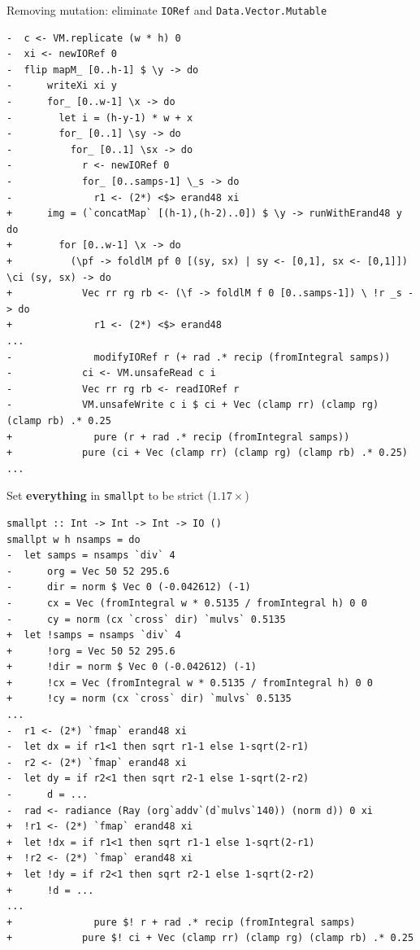 \documentclass[8pt]{beamer}
\begin{document}
\begin{frame}[fragile]{Removing mutation: eliminate \texttt{IORef} and \texttt{Data.Vector.Mutable}}
\begin{verbatim}
-  c <- VM.replicate (w * h) 0
-  xi <- newIORef 0
-  flip mapM_ [0..h-1] $ \y -> do
-      writeXi xi y
-      for_ [0..w-1] \x -> do
-        let i = (h-y-1) * w + x
-        for_ [0..1] \sy -> do
-          for_ [0..1] \sx -> do
-            r <- newIORef 0
-            for_ [0..samps-1] \_s -> do
-              r1 <- (2*) <$> erand48 xi
+      img = (`concatMap` [(h-1),(h-2)..0]) $ \y -> runWithErand48 y do
+        for [0..w-1] \x -> do
+          (\pf -> foldlM pf 0 [(sy, sx) | sy <- [0,1], sx <- [0,1]]) \ci (sy, sx) -> do
+            Vec rr rg rb <- (\f -> foldlM f 0 [0..samps-1]) \ !r _s -> do
+              r1 <- (2*) <$> erand48
...
-              modifyIORef r (+ rad .* recip (fromIntegral samps))
-            ci <- VM.unsafeRead c i
-            Vec rr rg rb <- readIORef r
-            VM.unsafeWrite c i $ ci + Vec (clamp rr) (clamp rg) (clamp rb) .* 0.25
+              pure (r + rad .* recip (fromIntegral samps))
+            pure (ci + Vec (clamp rr) (clamp rg) (clamp rb) .* 0.25)
...
\end{verbatim}



\end{frame}


\begin{frame}[fragile]{Set \textbf{everything} in \texttt{smallpt} to be strict ($1.17\times$)}
\begin{verbatim}
smallpt :: Int -> Int -> Int -> IO ()
smallpt w h nsamps = do
-  let samps = nsamps `div` 4
-      org = Vec 50 52 295.6
-      dir = norm $ Vec 0 (-0.042612) (-1)
-      cx = Vec (fromIntegral w * 0.5135 / fromIntegral h) 0 0
-      cy = norm (cx `cross` dir) `mulvs` 0.5135
+  let !samps = nsamps `div` 4
+      !org = Vec 50 52 295.6
+      !dir = norm $ Vec 0 (-0.042612) (-1)
+      !cx = Vec (fromIntegral w * 0.5135 / fromIntegral h) 0 0
+      !cy = norm (cx `cross` dir) `mulvs` 0.5135
...
-  r1 <- (2*) `fmap` erand48 xi
-  let dx = if r1<1 then sqrt r1-1 else 1-sqrt(2-r1)
-  r2 <- (2*) `fmap` erand48 xi
-  let dy = if r2<1 then sqrt r2-1 else 1-sqrt(2-r2)
-      d = ...
-  rad <- radiance (Ray (org`addv`(d`mulvs`140)) (norm d)) 0 xi
+  !r1 <- (2*) `fmap` erand48 xi
+  let !dx = if r1<1 then sqrt r1-1 else 1-sqrt(2-r1)
+  !r2 <- (2*) `fmap` erand48 xi
+  let !dy = if r2<1 then sqrt r2-1 else 1-sqrt(2-r2)
+      !d = ...
...
+              pure $! r + rad .* recip (fromIntegral samps)
+            pure $! ci + Vec (clamp rr) (clamp rg) (clamp rb) .* 0.25
\end{verbatim}


\end{frame}
\end{document}
